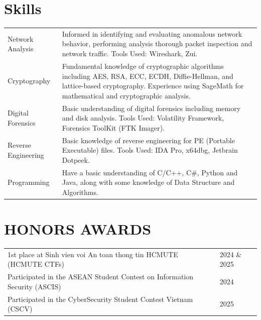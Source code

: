 \documentclass[a4paper,12pt]{article}
\begin{document}
\section{Skills}
\begin{tabularx}{\linewidth}{@{}l X@{}}
Network Analysis &  \normalsize{ Informed in identifying and evaluating anomalous network behavior, performing 
analysis thorough packet inspection and network traffic. Tools Used: Wireshark, Zui.}\\
Cryptography & \normalsize{Fundamental knowledge of cryptographic algorithms including AES, RSA, ECC, ECDH, Diffie-Hellman, and lattice-based cryptography. Experience using SageMath for mathematical and cryptographic analysis.} \\

Digital Forensics & \normalsize{Basic understanding of digital forensics including memory and disk analysis. Tools Used: Volatility Framework, Forensics ToolKit (FTK Imager).} \\

Reverse Engineering & \normalsize{Basic knowledge of reverse engineering for PE (Portable Executable) files. Tools Used: IDA Pro, x64dbg, Jetbrain Dotpeek.}
\\
Programming  &  \normalsize{Have a basic understanding of C/C++, C\#, Python and Java, along with some knowledge of Data Structure and Algorithms.}
\end{tabularx}

\section{HONORS AWARDS}
\begin{tabularx}{\linewidth}{@{}l X@{}}
1st place at Sinh vien voi An toan thong tin HCMUTE (HCMUTE CTFs) &  \normalsize{2024 \& 2025}\\
Participated in the ASEAN Student Contest on Information Security (ASCIS) &  \normalsize{2024}\\
Participated in the CyberSecurity Student Contest Vietnam (CSCV) &  \normalsize{2025}\\
\end{tabularx}

\vfill
{}
\end{document}
